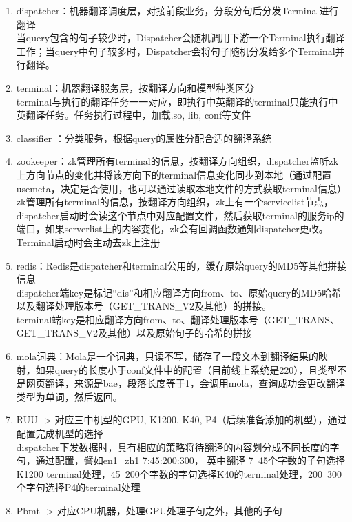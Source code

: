 \documentclass[10pt,a4paper]{ctexbook}
\begin{document}
\begin{enumerate}
\item dispatcher：机器翻译调度层，对接前段业务，分段分句后分发Terminal进行翻译\\
当query包含的句子较少时，Dispatcher会随机调用下游一个Terminal执行翻译工作；当query中句子较多时，Dispatcher会将句子随机分发给多个Terminal并行翻译。

\item terminal：机器翻译服务层，按翻译方向和模型种类区分 \\
terminal与执行的翻译任务一一对应，即执行中英翻译的terminal只能执行中英翻译任务。任务执行过程中，加载.so, lib, conf等文件

\item classifier ：分类服务，根据query的属性分配合适的翻译系统

\item zookeeper：zk管理所有terminal的信息，按翻译方向组织，dispatcher监听zk上方向节点的变化并将该方向下的terminal信息变化同步到本地（通过配置usemeta，决定是否使用，也可以通过读取本地文件的方式获取terminal信息）\\
zk管理所有terminal的信息，按翻译方向组织，zk上有一个servicelist节点，dispatcher启动时会读这个节点中对应配置文件，然后获取terminal的服务ip的端口，如果serverlist上的内容变化，zk会有回调函数通知dispatcher更改。Terminal启动时会主动去zk上注册

\item redis：Redis是dispatcher和terminal公用的，缓存原始query的MD5等其他拼接信息 \\
dispatcher端key是标记“dis”和相应翻译方向from、to、原始query的MD5哈希以及翻译处理版本号（GET\_TRANS\_V2及其他）的拼接。 \\
terminal端key是相应翻译方向from、to、翻译处理版本号（GET\_TRANS、GET\_TRANS\_V2及其他）以及原始句子的哈希的拼接

\item mola词典：Mola是一个词典，只读不写，储存了一段文本到翻译结果的映射，如果query的长度小于conf文件中的配置（目前线上系统是220），且类型不是网页翻译，来源是bae，段落长度等于1，会调用mola，查询成功会更改翻译类型为单词，然后返回。

\item RUU -> 对应三中机型的GPU, K1200, K40, P4（后续准备添加的机型），通过配置完成机型的选择 \\
dispatcher下发数据时，具有相应的策略将待翻译的内容划分成不同长度的字句，通过配置，譬如en1\_zh1 7:45:200:300， 英中翻译 7~45个字数的子句选择K1200 terminal处理，45~200个字数的字句选择K40的terminal处理，200~300个字句选择P4的terminal处理

\item Pbmt -> 对应CPU机器，处理GPU处理子句之外，其他的子句
\end{enumerate}
 
\end{document}

